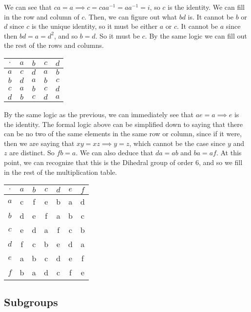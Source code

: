  \begin{solution}
    We can see that $ca = a \implies c = ca a^{-1} = a a^{-1} = i$, so $c$ is the identity. We can fill in the row and column of $c$. Then, we can figure out what $bd$ is. It cannot be $b$ or $d$ since $c$ is the unique identity, so it must be either $a$ or $c$. It cannot be $a$ since then $bd = a = d^2$, and so $b = d$. So it must be $c$. By the same logic we can fill out the rest of the rows and columns. 

    \begin{tabular}{c|cccc}
      $\cdot$ & $a$ & $b$ & $c$ & $d$ \\
      \hline
      $a$ & $c$ & $d$ & $a$ & $b$ \\
      $b$ & $d$ & $a$ & $b$ & $c$ \\
      $c$ & $a$ & $b$ & $c$ & $d$ \\
      $d$ & $b$ & $c$ & $d$ & $a$ \\
    \end{tabular}

    By the same logic as the previous, we can immediately see that $ae = a \implies e$ is the identity. The formal logic above can be simplified down to saying that there can be no two of the same elements in the same row or column, since if it were, then we are saying that $xy = xz \implies y = z$, which cannot be the case since $y$ and $z$ are distinct. So $fb = a$. We can also deduce that $da = ab$ and $ba = af$. At this point, we can recognize that this is the Dihedral group of order $6$, and so we fill in the rest of the multiplication table. 

    \begin{tabular}{c|cccccc}
      $\cdot$ & $a$ & $b$ & $c$ & $d$ & $e$ & $f$ \\
      \hline
      $a$ & c & f & e & b & a & d \\
      $b$ & d & e & f & a & b & c \\
      $c$ & e & d & a & f & c & b \\
      $d$ & f & c & b & e & d & a \\
      $e$ & a & b & c & d & e & f \\
      $f$ & b & a & d & c & f & e
    \end{tabular}
  \end{solution}

\subsection{Subgroups}

